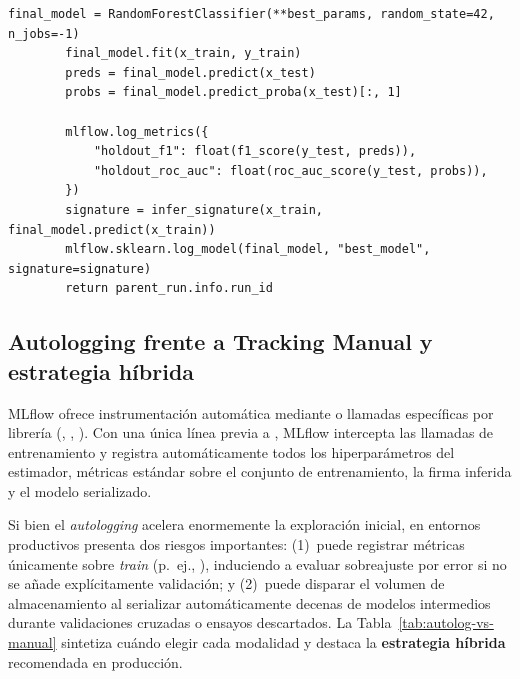 \begin{lstlisting}[style=python, caption={Optimización bayesiana con Optuna integrada con runs anidados (nested=True) en MLflow Tracking.}, label={lst:mlflow-optuna-nested}]
        final_model = RandomForestClassifier(**best_params, random_state=42, n_jobs=-1)
        final_model.fit(x_train, y_train)
        preds = final_model.predict(x_test)
        probs = final_model.predict_proba(x_test)[:, 1]

        mlflow.log_metrics({
            "holdout_f1": float(f1_score(y_test, preds)),
            "holdout_roc_auc": float(roc_auc_score(y_test, probs)),
        })
        signature = infer_signature(x_train, final_model.predict(x_train))
        mlflow.sklearn.log_model(final_model, "best_model", signature=signature)
        return parent_run.info.run_id
\end{lstlisting}

\subsection{Autologging frente a Tracking Manual y estrategia híbrida}

MLflow ofrece instrumentación automática mediante  o llamadas específicas por librería (, , ). Con una única línea previa a , MLflow intercepta las llamadas de entrenamiento y registra automáticamente todos los hiperparámetros del estimador, métricas estándar sobre el conjunto de entrenamiento, la firma inferida y el modelo serializado.

Si bien el \textit{autologging} acelera enormemente la exploración inicial, en entornos productivos presenta dos riesgos importantes: (1)~puede registrar métricas únicamente sobre \textit{train} (p.~ej., ), induciendo a evaluar sobreajuste por error si no se añade explícitamente validación; y (2)~puede disparar el volumen de almacenamiento al serializar automáticamente decenas de modelos intermedios durante validaciones cruzadas o ensayos descartados. La Tabla~\ref{tab:autolog-vs-manual} sintetiza cuándo elegir cada modalidad y destaca la \textbf{estrategia híbrida} recomendada en producción.

